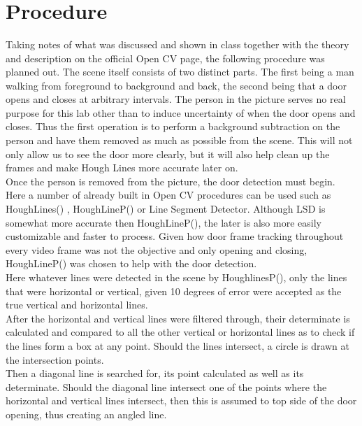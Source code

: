 \documentclass{article}
\begin{document}
\begin{lstlisting}




\end{lstlisting}
\section{Procedure}\label{sec:intro}
Taking notes of what was discussed and shown in class together with the theory and description on the official Open CV page, the following procedure was planned out. 
The scene itself consists of two distinct parts. The first being a man walking from foreground to background and back, the second being that a door opens and closes at arbitrary intervals. The person in the picture serves no real purpose for this lab other than to induce uncertainty of when the door opens and closes. Thus the first operation is to perform a background subtraction on the person and have them removed as much as possible from the scene. This will not only allow us to see the door more clearly, but it will also help clean up the frames and make Hough Lines more accurate later on.\\


Once the person is removed from the picture, the door detection must begin.\\ Here a number of already built in Open CV procedures can be used such as HoughLines() , HoughLineP() or Line Segment Detector. Although LSD is somewhat more accurate then HoughLineP(), the later is also more easily customizable and faster to process. Given how door frame tracking throughout every video frame was not the objective and only opening and closing, HoughLineP() was chosen to help with the door detection. \\
Here whatever lines were detected in the scene by HoughlinesP(), only the lines that were horizontal or vertical, given 10 degrees of error were accepted as the true vertical and horizontal lines.\\
After the horizontal and vertical lines were filtered through, their determinate is calculated and compared to all the other vertical or horizontal lines as to check if the lines form a box at any point. Should the lines intersect, a circle is drawn at the intersection points.\\
Then a diagonal line is searched for, its point calculated as well as its determinate. Should the diagonal line intersect one of the points where the horizontal and vertical lines intersect, then this is assumed to top side of the door opening, thus creating an angled line.\\ 
\end{document}
